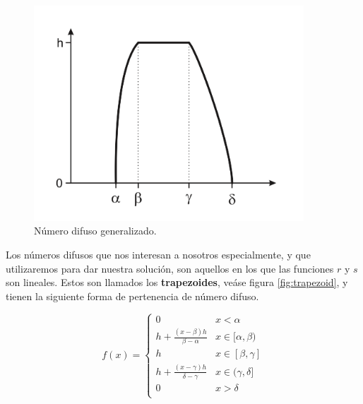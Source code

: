\begin{figure}[h]
  \centering
  \includegraphics[width=0.9\textwidth]{gfx/fuzzynumber.png}
  \caption{\label{fig:generaltrapezoid}Número difuso generalizado.}
\end{figure}

Los números difusos que nos interesan a nosotros especialmente, y que utilizaremos para dar nuestra solución, son aquellos en los que las funciones $r$ y $s$ son lineales. Estos son llamados los \textbf{trapezoides}, veáse figura \ref{fig:trapezoid}, y tienen la siguiente forma de pertenencia de número difuso.

\begin{equation}\label{trapezoidrepresentation}
    f(x) = \left\{ { \begin{array}{cc}
                    0 & x < \alpha \\ 
                    h + \frac{(x-\beta)h}{\beta-\alpha} & x\in [\alpha,\beta) \\
                    h & x\in [\beta,\gamma] \\
                    h + \frac{(x-\gamma)h}{\delta-\gamma} & x\in (\gamma,\delta] \\
                    0 & x > \delta \\ 
                    \end{array}  } \right.
\end{equation}

